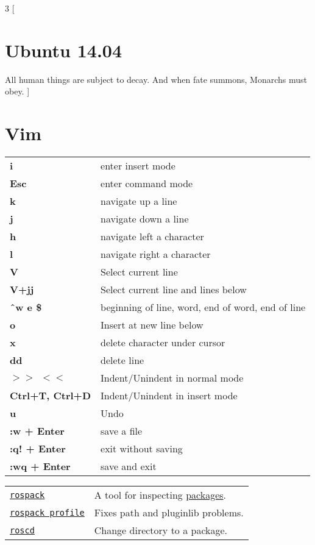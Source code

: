 \documentclass[10pt,landscape]{article}
\begin{document}
\begin{multicols}{3}
[
\section*{Ubuntu 14.04}
All human things are subject to decay. And when fate summons, Monarchs must obey.
]

\section*{Vim}
\vspace{-0.7em}
\begin{tabular}{l l}
\textbf{i} & enter insert mode\\
\textbf{Esc} & enter command mode \\
\textbf{k} & navigate up a line\\
\textbf{j} & navigate down a line\\
\textbf{h} & navigate left a character\\
\textbf{l} & navigate right a character\\
\textbf{V} & Select current line\\
\textbf{V+jj} & Select current line and lines below\\
\textbf{\^\ w e \$} & beginning of line, word, end of word, end of line\\
\textbf{o} & Insert at new line below\\
\textbf{x} & delete character under cursor\\
\textbf{dd} & delete line\\
\textbf{$>>\ \ <<$} & Indent/Unindent in normal mode\\
\textbf{Ctrl+T, Ctrl+D} & Indent/Unindent in insert mode\\
\textbf{u} & Undo\\
\textbf{:w + Enter} & save a file\\
\textbf{:q! + Enter} & exit without saving\\
\textbf{:wq + Enter} & save and exit\\
\end{tabular}

\vfill
\columnbreak

\begin{tabular}{l l}
\texttt{\href{http://wiki.ros.org/rospack}{rospack}} & A tool for inspecting \href{http://wiki.ros.org/Packages}{packages}. \\
\texttt{\href{http://docs.ros.org/independent/api/rospkg/html/rospack.html\#rospack-profile}{rospack profile}} & Fixes path and pluginlib problems. \\
\texttt{\href{http://wiki.ros.org/rosbash\#roscd}{roscd}} & Change directory to a package. \\
\end{tabular}


\end{multicols}
\end{document}
